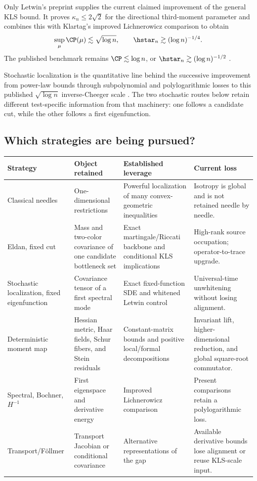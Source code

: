 \documentclass[../../main.tex]{subfiles}
\begin{document}
Only Letwin's preprint supplies the current claimed improvement of the general KLS bound. It
proves $\kappa_n\le2\sqrt2$ for the directional third-moment parameter and combines this with
Klartag's improved Lichnerowicz comparison to obtain
\[
  \sup_\mu\CP(\mu)\lesssim\sqrt{\log n},
  \qquad
  \hstar_n\gtrsim(\log n)^{-1/4}.
\]
The published benchmark remains $\CP\lesssim\log n$, or
$\hstar_n\gtrsim(\log n)^{-1/2}$ \cite{Klartag2023Logarithmic}.

Stochastic localization is the quantitative line behind the successive improvement from
power-law bounds through subpolynomial and polylogarithmic losses to this published
$\sqrt{\log n}$ inverse-Cheeger scale
\cite{LeeVempala2018,Chen2021,KlartagLehec2022Polylog,JambulapatiLeeVempala2022KLS,Klartag2023Logarithmic}.
The two stochastic routes below retain different test-specific information from that machinery:
one follows a candidate cut, while the other follows a first eigenfunction.

\subsection{Which strategies are being pursued?}

\begin{center}
\begin{tabularx}{\textwidth}{@{}>{\raggedright\arraybackslash}p{}>{\raggedright\arraybackslash}p{}>{\raggedright\arraybackslash}p{}Y@{}}
\toprule
Strategy & Object retained & Established leverage & Current loss \\
\midrule
Classical needles & One-dimensional restrictions & Powerful localization of many convex-geometric inequalities & Isotropy is global and is not retained needle by needle. \\
\addlinespace
Eldan, fixed cut & Mass and two-color covariance of one candidate bottleneck set & Exact martingale/Riccati backbone and conditional KLS implications & High-rank source occupation; operator-to-trace upgrade. \\
\addlinespace
Stochastic localization, fixed eigenfunction & Covariance tensor of a first spectral mode & Exact fixed-function SDE and whitened Letwin control & Universal-time unwhitening without losing alignment. \\
\addlinespace
Deterministic moment map & Hessian metric, Haar fields, Schur fibers, and Stein residuals & Constant-matrix bounds and positive local/formal decompositions & Invariant lift, higher-dimensional reduction, and global square-root commutator. \\
\addlinespace
Spectral, Bochner, $H^{-1}$ & First eigenspace and derivative energy & Improved Lichnerowicz comparison & Present comparisons retain a polylogarithmic loss. \\
\addlinespace
Transport/F\"ollmer & Transport Jacobian or conditional covariance & Alternative representations of the gap & Available derivative bounds lose alignment or reuse KLS-scale input. \\
\bottomrule
\end{tabularx}
\end{center}
\end{document}
